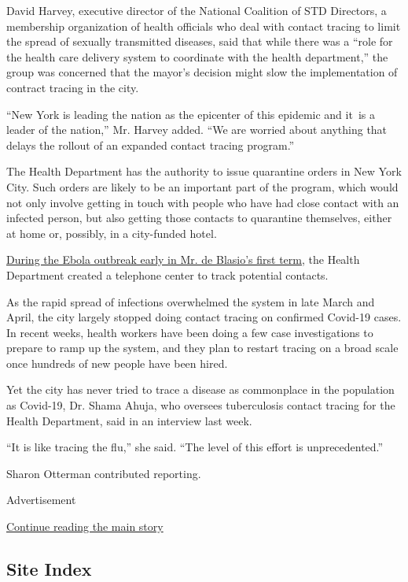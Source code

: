 David Harvey, executive director of the National Coalition of STD
Directors, a membership organization of health officials who deal with
contact tracing to limit the spread of sexually transmitted diseases,
said that while there was a ``role for the health care delivery system
to coordinate with the health department,'' the group was concerned that
the mayor's decision might slow the implementation of contract tracing
in the city.

``New York is leading the nation as the epicenter of this epidemic and
it~is a leader of the nation,'' Mr. Harvey added. ``We are worried about
anything that delays the rollout of an expanded contact tracing
program.''

The Health Department has the authority to issue quarantine orders in
New York City. Such orders are likely to be an important part of the
program, which would not only involve getting in touch with people who
have had close contact with an infected person, but also getting those
contacts to quarantine themselves, either at home or, possibly, in a
city-funded hotel.

\href{https://www.nytimes.com/2014/10/24/nyregion/tracing-patients-possible-contacts-creates-host-of-challenges-for-the-city.html}{During
the Ebola outbreak early in Mr. de Blasio's first term}, the Health
Department created a telephone center to track potential contacts.

As the rapid spread of infections overwhelmed the system in late March
and April, the city largely stopped doing contact tracing on confirmed
Covid-19 cases. In recent weeks, health workers have been doing a few
case investigations to prepare to ramp up the system, and they plan to
restart tracing on a broad scale once hundreds of new people have been
hired.

Yet the city has never tried to trace a disease as commonplace in the
population as Covid-19, Dr. Shama Ahuja, who oversees tuberculosis
contact tracing for the Health Department, said in an interview last
week.

``It is like tracing the flu,'' she said. ``The level of this effort is
unprecedented.''

Sharon Otterman contributed reporting.

Advertisement

\protect\hyperlink{after-bottom}{Continue reading the main story}

\hypertarget{site-index}{%
\subsection{Site Index}\label{site-index}}

